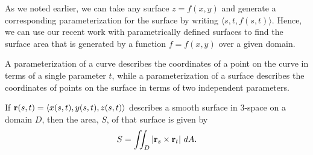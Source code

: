 \vspace*{5pt}
\nin {}
\vspace*{5pt}



%

As we noted earlier, we can take any surface $z = f(x,y)$ and generate a corresponding parameterization for the surface by writing $\langle s, t, f(s,t) \rangle$.    Hence, we can use our recent work with parametrically defined surfaces to find the surface area that is generated by a function $f = f(x,y)$ over a given domain.



\begin{summary}
\item A parameterization of a curve describes the coordinates of a point on the curve in terms of a single parameter $t$, while a parameterization of a surface describes the coordinates of points on the surface in terms of two independent parameters.
\item If $\mathbf{r}(s,t) = \langle x(s,t), y(s,t), z(s,t) \rangle$ describes a smooth surface in 3-space on a domain $D$, then the area, $S$, of that surface is given by
\[S = \iint_D |\mathbf{r}_s \times \mathbf{r}_t| \ dA.\]
\end{summary}


\nin \hrulefill

\newpage



\clearpage
